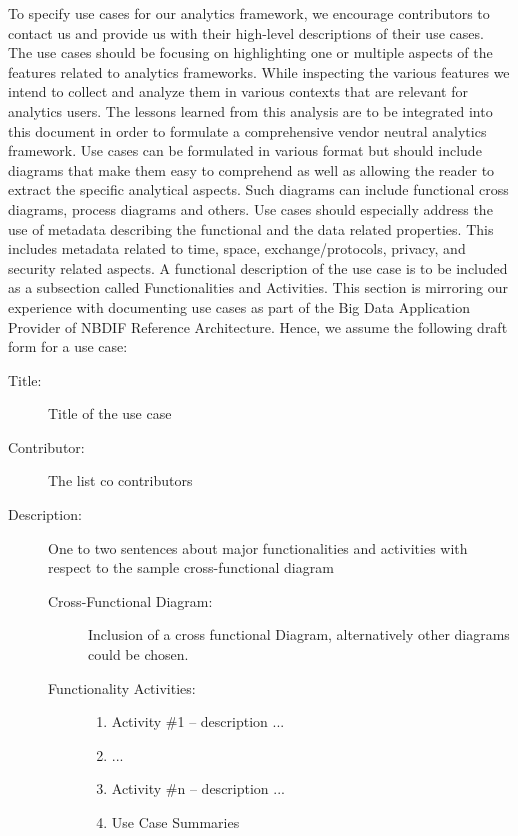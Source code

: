 To specify use cases for our analytics framework, we encourage
contributors to contact us and provide us with their high-level
descriptions of their use cases. The use cases should be focusing on
highlighting one or multiple aspects of the features related to
analytics frameworks. While inspecting the various features we intend
to collect and analyze them in various contexts that are relevant for
analytics users. The lessons learned from this analysis are to be
integrated into this document in order to formulate a comprehensive
vendor neutral analytics framework.  Use cases can be formulated in
various format but should include diagrams that make them easy to
comprehend as well as allowing the reader to extract the specific
analytical aspects. Such diagrams can include functional cross
diagrams, process diagrams and others.  Use cases should especially
address the use of metadata describing the functional and the data
related properties. This includes metadata related to time, space,
exchange/protocols, privacy, and security related aspects.  A
functional description of the use case is to be included as a
subsection called Functionalities and Activities. This section is
mirroring our experience with documenting use cases as part of the Big
Data Application Provider of NBDIF Reference Architecture. Hence, we
assume the following draft form for a use case:

\begin{description}
\item[Title:] 		Title of the use case
\item[Contributor:] 	The list co contributors
\item[Description:] 	One to two sentences about major functionalities and activities with respect to the sample cross-functional diagram
	
	\begin{description}
	\item[Cross-Functional Diagram:]
		Inclusion of a cross functional Diagram, alternatively other diagrams could be 			chosen.
	\item[Functionality Activities:]
	\begin{enumerate}
        \item Activity \#1 -- description ...
        \item ...
        \item Activity \#n -- description ...
    	\item Use Case Summaries
    \end{enumerate}
\end{description}
\end{description}

